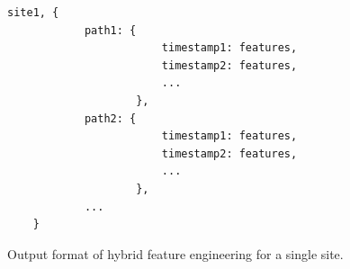 \begin{figure}[H]
\lstset{numbers=left}
\begin{lstlisting}[language=Python]
site1, {
            path1: {
                        timestamp1: features,
                        timestamp2: features,
                        ...
                    },
            path2: {
                        timestamp1: features,
                        timestamp2: features,
                        ...
                    },
            ...
    }
\end{lstlisting}
\caption{Output format of hybrid feature engineering for a single site.}
\label{alg:hybrid_map}
\end{figure}



